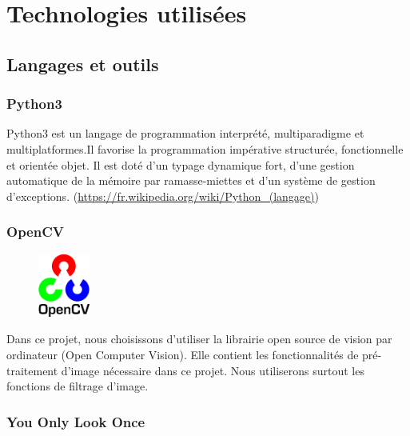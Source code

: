 \documentclass[a4paper]{article}
\begin{document}
	\section{Technologies utilisées} 
		\subsection{Langages et outils}
			\subsubsection{Python3}
				Python3 est un langage de programmation interprété, multiparadigme et multiplatformes.Il favorise la programmation impérative structurée, fonctionnelle et orientée objet. Il est doté d'un typage dynamique fort, d'une gestion automatique de la mémoire par ramasse-miettes et d'un système de gestion d'exceptions. (\url{https://fr.wikipedia.org/wiki/Python_(langage)})
			\subsubsection{OpenCV}
				\begin{figure}
					\includegraphics[width=0.15\textwidth]{OpenCV.png}
				\end{figure}
				Dans ce projet, nous choisissons d'utiliser la librairie open source de vision par ordinateur (Open Computer Vision). Elle contient les fonctionnalités de pré-traitement d'image nécessaire dans ce projet. Nous utiliserons surtout les fonctions de filtrage d'image.
				\newline
			\subsubsection{You Only Look Once}
\end{document}
